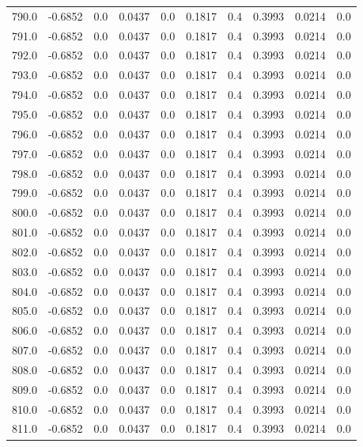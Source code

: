 \begin{longtable}{lrrrrrrrrr}
790.0 & -0.6852 & 0.0 & 0.0437 & 0.0 & 0.1817 & 0.4 & 0.3993 & 0.0214 & 0.0 \\
791.0 & -0.6852 & 0.0 & 0.0437 & 0.0 & 0.1817 & 0.4 & 0.3993 & 0.0214 & 0.0 \\
792.0 & -0.6852 & 0.0 & 0.0437 & 0.0 & 0.1817 & 0.4 & 0.3993 & 0.0214 & 0.0 \\
793.0 & -0.6852 & 0.0 & 0.0437 & 0.0 & 0.1817 & 0.4 & 0.3993 & 0.0214 & 0.0 \\
794.0 & -0.6852 & 0.0 & 0.0437 & 0.0 & 0.1817 & 0.4 & 0.3993 & 0.0214 & 0.0 \\
795.0 & -0.6852 & 0.0 & 0.0437 & 0.0 & 0.1817 & 0.4 & 0.3993 & 0.0214 & 0.0 \\
796.0 & -0.6852 & 0.0 & 0.0437 & 0.0 & 0.1817 & 0.4 & 0.3993 & 0.0214 & 0.0 \\
797.0 & -0.6852 & 0.0 & 0.0437 & 0.0 & 0.1817 & 0.4 & 0.3993 & 0.0214 & 0.0 \\
798.0 & -0.6852 & 0.0 & 0.0437 & 0.0 & 0.1817 & 0.4 & 0.3993 & 0.0214 & 0.0 \\
799.0 & -0.6852 & 0.0 & 0.0437 & 0.0 & 0.1817 & 0.4 & 0.3993 & 0.0214 & 0.0 \\
800.0 & -0.6852 & 0.0 & 0.0437 & 0.0 & 0.1817 & 0.4 & 0.3993 & 0.0214 & 0.0 \\
801.0 & -0.6852 & 0.0 & 0.0437 & 0.0 & 0.1817 & 0.4 & 0.3993 & 0.0214 & 0.0 \\
802.0 & -0.6852 & 0.0 & 0.0437 & 0.0 & 0.1817 & 0.4 & 0.3993 & 0.0214 & 0.0 \\
803.0 & -0.6852 & 0.0 & 0.0437 & 0.0 & 0.1817 & 0.4 & 0.3993 & 0.0214 & 0.0 \\
804.0 & -0.6852 & 0.0 & 0.0437 & 0.0 & 0.1817 & 0.4 & 0.3993 & 0.0214 & 0.0 \\
805.0 & -0.6852 & 0.0 & 0.0437 & 0.0 & 0.1817 & 0.4 & 0.3993 & 0.0214 & 0.0 \\
806.0 & -0.6852 & 0.0 & 0.0437 & 0.0 & 0.1817 & 0.4 & 0.3993 & 0.0214 & 0.0 \\
807.0 & -0.6852 & 0.0 & 0.0437 & 0.0 & 0.1817 & 0.4 & 0.3993 & 0.0214 & 0.0 \\
808.0 & -0.6852 & 0.0 & 0.0437 & 0.0 & 0.1817 & 0.4 & 0.3993 & 0.0214 & 0.0 \\
809.0 & -0.6852 & 0.0 & 0.0437 & 0.0 & 0.1817 & 0.4 & 0.3993 & 0.0214 & 0.0 \\
810.0 & -0.6852 & 0.0 & 0.0437 & 0.0 & 0.1817 & 0.4 & 0.3993 & 0.0214 & 0.0 \\
811.0 & -0.6852 & 0.0 & 0.0437 & 0.0 & 0.1817 & 0.4 & 0.3993 & 0.0214 & 0.0 \\

\end{longtable}
